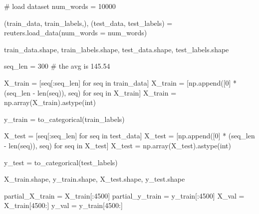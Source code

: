 \documentclass[
  letterpaper,
  DIV=11,
  numbers=noendperiod]{scrreprt}
\newenvironment{Shaded}{\begin{snugshade}}{\end{snugshade}}
\newcommand{\BuiltInTok}[1]{\textcolor[rgb]{0.00,0.23,0.31}{#1}}
\newcommand{\CommentTok}[1]{\textcolor[rgb]{0.37,0.37,0.37}{#1}}
\newcommand{\ControlFlowTok}[1]{\textcolor[rgb]{0.00,0.23,0.31}{#1}}
\newcommand{\DecValTok}[1]{\textcolor[rgb]{0.68,0.00,0.00}{#1}}
\newcommand{\KeywordTok}[1]{\textcolor[rgb]{0.00,0.23,0.31}{#1}}
\newcommand{\NormalTok}[1]{\textcolor[rgb]{0.00,0.23,0.31}{#1}}
\newcommand{\OperatorTok}[1]{\textcolor[rgb]{0.37,0.37,0.37}{#1}}
\begin{document}
\begin{Shaded}
\begin{Highlighting}[]
\CommentTok{\# load dataset}
\NormalTok{num\_words }\OperatorTok{=} \DecValTok{10000}

\NormalTok{(train\_data, train\_labels,), (test\_data, test\_labels) }\OperatorTok{=}\NormalTok{ reuters.load\_data(num\_words }\OperatorTok{=}\NormalTok{ num\_words)}

\NormalTok{train\_data.shape, train\_labels.shape, test\_data.shape, test\_labels.shape}
\end{Highlighting}
\end{Shaded}

\begin{Shaded}
\begin{Highlighting}[]
\NormalTok{seq\_len }\OperatorTok{=} \DecValTok{300} \CommentTok{\# the avg is 145.54}

\NormalTok{X\_train }\OperatorTok{=}\NormalTok{ [seq[:seq\_len] }\ControlFlowTok{for}\NormalTok{ seq }\KeywordTok{in}\NormalTok{ train\_data]}
\NormalTok{X\_train }\OperatorTok{=}\NormalTok{ [np.append([}\DecValTok{0}\NormalTok{] }\OperatorTok{*}\NormalTok{ (seq\_len }\OperatorTok{{-}} \BuiltInTok{len}\NormalTok{(seq)), seq) }\ControlFlowTok{for}\NormalTok{ seq }\KeywordTok{in}\NormalTok{ X\_train]}
\NormalTok{X\_train }\OperatorTok{=}\NormalTok{ np.array(X\_train).astype(}\BuiltInTok{int}\NormalTok{)}

\NormalTok{y\_train }\OperatorTok{=}\NormalTok{ to\_categorical(train\_labels)}

\NormalTok{X\_test }\OperatorTok{=}\NormalTok{ [seq[:seq\_len] }\ControlFlowTok{for}\NormalTok{ seq }\KeywordTok{in}\NormalTok{ test\_data]}
\NormalTok{X\_test }\OperatorTok{=}\NormalTok{ [np.append([}\DecValTok{0}\NormalTok{] }\OperatorTok{*}\NormalTok{ (seq\_len }\OperatorTok{{-}} \BuiltInTok{len}\NormalTok{(seq)), seq) }\ControlFlowTok{for}\NormalTok{ seq }\KeywordTok{in}\NormalTok{ X\_test]}
\NormalTok{X\_test }\OperatorTok{=}\NormalTok{ np.array(X\_test).astype(}\BuiltInTok{int}\NormalTok{)}

\NormalTok{y\_test }\OperatorTok{=}\NormalTok{ to\_categorical(test\_labels)}

\NormalTok{X\_train.shape, y\_train.shape, X\_test.shape, y\_test.shape}
\end{Highlighting}
\end{Shaded}

\begin{Shaded}
\begin{Highlighting}[]
\NormalTok{partial\_X\_train }\OperatorTok{=}\NormalTok{ X\_train[:}\DecValTok{4500}\NormalTok{]}
\NormalTok{partial\_y\_train }\OperatorTok{=}\NormalTok{ y\_train[:}\DecValTok{4500}\NormalTok{]}
\NormalTok{X\_val }\OperatorTok{=}\NormalTok{ X\_train[}\DecValTok{4500}\NormalTok{:]}
\NormalTok{y\_val }\OperatorTok{=}\NormalTok{ y\_train[}\DecValTok{4500}\NormalTok{:]}
\end{Highlighting}
\end{Shaded}
\end{document}
